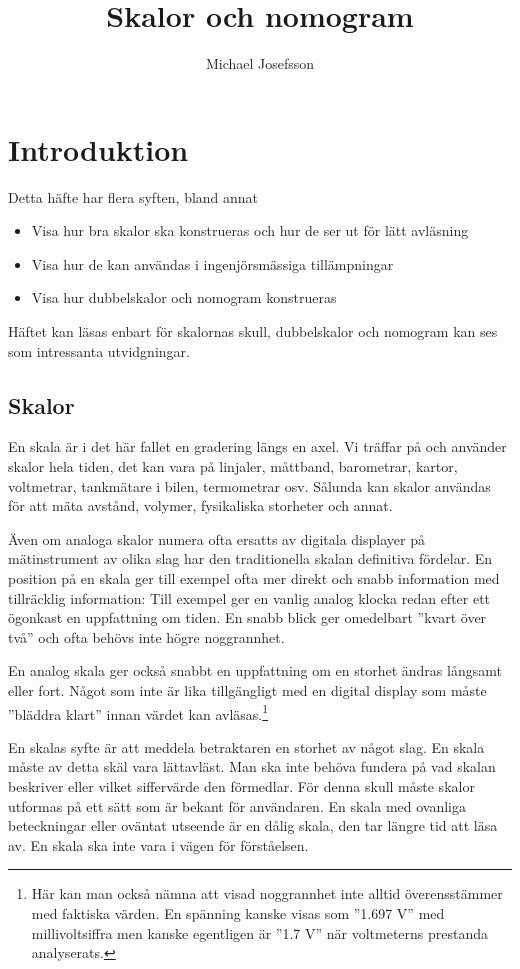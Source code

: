 \documentclass[oneside,11pt,a4paper,swedish]{scrbook}
\begin{document}
\title{Skalor och nomogram\\{}}
\author{Michael Josefsson}
\date{}
\tableofcontents
\chapter{Introduktion}
Detta häfte har flera syften, bland annat

\begin{itemize}
\item Visa hur bra skalor ska konstrueras och hur de ser ut för lätt avläsning
\item Visa hur de kan användas i ingenjörsmässiga tillämpningar
\item Visa hur dubbelskalor och nomogram konstrueras
\end{itemize}

Häftet kan läsas enbart för skalornas skull, dubbelskalor och nomogram kan ses som intressanta utvidgningar.

\section{Skalor}
En skala är i det här fallet en gradering längs en axel. Vi träffar på och använder skalor hela tiden, det kan vara på linjaler, måttband, barometrar, kartor, voltmetrar, tankmätare i bilen, termometrar osv. Sålunda kan skalor användas för att mäta avstånd, volymer, fysikaliska storheter och annat. 

Även om analoga skalor numera ofta ersatts av digitala displayer på mätinstrument av olika slag har den traditionella skalan definitiva fördelar. En position på en skala ger till exempel ofta mer direkt och snabb information med tillräcklig information: Till exempel ger en vanlig analog klocka redan efter ett ögonkast en uppfattning om tiden. En snabb blick ger omedelbart ''kvart över två'' och ofta behövs inte högre noggrannhet. 

En analog skala ger också snabbt en uppfattning om en storhet ändras långsamt eller fort. Något som inte är lika tillgängligt med en digital display som måste ''bläddra klart'' innan värdet kan avläsas.\footnote{Här kan man också nämna att visad noggrannhet inte alltid överensstämmer med faktiska värden. En spänning kanske visas som ''1.697 V'' med millivoltsiffra men kanske egentligen är ''1.7 V'' när voltmeterns prestanda analyserats.}

En skalas syfte är att meddela betraktaren en storhet av något slag. En skala måste av detta skäl vara lättavläst. Man ska inte behöva fundera på vad skalan beskriver eller vilket siffervärde den förmedlar. För denna skull måste skalor utformas på ett sätt som är bekant för användaren. En skala med ovanliga beteckningar eller oväntat utseende är en dålig skala, den tar längre tid att läsa av. En skala ska inte vara i vägen för förståelsen.
\end{document}
